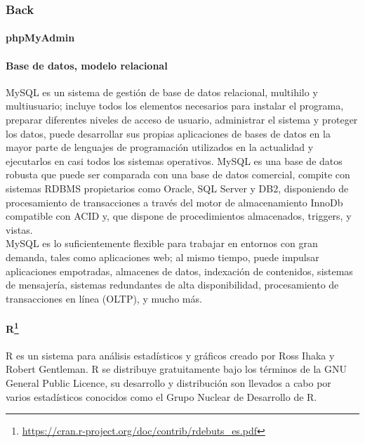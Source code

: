 \documentclass[
]{article}
\begin{document}
\hypertarget{back}{%
\subsubsection{Back}\label{back}}

\hypertarget{phpmyadmin}{%
\paragraph{phpMyAdmin}\label{phpmyadmin}}

\hypertarget{base-de-datos-modelo-relacional}{%
\paragraph{Base de datos, modelo
relacional}\label{base-de-datos-modelo-relacional}}

MySQL es un sistema de gestión de base de datos relacional, multihilo y
multiusuario; incluye todos los elementos necesarios para instalar el
programa, preparar diferentes niveles de acceso de usuario, administrar
el sistema y proteger los datos, puede desarrollar sus propias
aplicaciones de bases de datos en la mayor parte de lenguajes de
programación utilizados en la actualidad y ejecutarlos en casi todos los
sistemas operativos. MySQL es una base de datos robusta que puede ser
comparada con una base de datos comercial, compite con sistemas RDBMS
propietarios como Oracle, SQL Server y DB2, disponiendo de procesamiento
de transacciones a través del motor de almacenamiento InnoDb compatible
con ACID y, que dispone de procedimientos almacenados, triggers, y
vistas.\\
MySQL es lo suficientemente flexible para trabajar en entornos con gran
demanda, tales como aplicaciones web; al mismo tiempo, puede impulsar
aplicaciones empotradas, almacenes de datos, indexación de contenidos,
sistemas de mensajería, sistemas redundantes de alta disponibilidad,
procesamiento de transacciones en línea (OLTP), y mucho más.

\hypertarget{r12}{%
\paragraph[R]{\texorpdfstring{R\footnote{\url{https://cran.r-project.org/doc/contrib/rdebuts_es.pdf}}}{R}}\label{r12}}

R es un sistema para análisis estadísticos y gráficos creado por Ross
Ihaka y Robert Gentleman. R se distribuye gratuitamente bajo los
términos de la GNU General Public Licence, su desarrollo y distribución
son llevados a cabo por varios estadísticos conocidos como el Grupo
Nuclear de Desarrollo de R.
\end{document}
